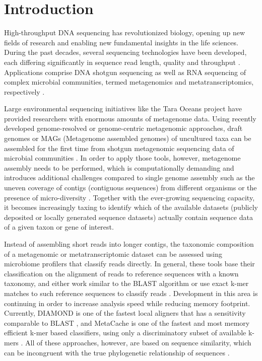 \documentclass{bioinfo}
\begin{document}
\maketitle

\section{Introduction}
High-throughput DNA sequencing has revolutionized biology, opening up new fields of research and enabling new fundamental insights in the life sciences. During the past decades, several sequencing technologies have been developed, each differing significantly in sequence read length, quality and throughput \citep{Mardis2017}. Applications comprise DNA shotgun sequencing as well as RNA sequencing of complex microbial communities, termed metagenomics and metatranscriptomics, respectively \citep{Mitchell2018}. 

Large environmental sequencing initiatives like the Tara Oceans project \citep{Sunagawa2015} have provided researchers with enormous amounts of metagenome data. Using recently developed genome-resolved or genome-centric metagenomic approaches, draft genomes or MAGs (Metagenome assembled genomes) of uncultured taxa can be assembled for the first time from shotgun metagenomic sequencing data of microbial communities \citep{Alneberg2014,Eren2015}. In order to apply those tools, however, metagenome assembly needs to be performed, which is computationally demanding and introduces additional challenges compared to single genome assembly such as the uneven coverage of contigs (contiguous sequences) from different organisms or the presence of micro-diversity \citep{Quince2017}. Together with the ever-growing sequencing capacity, it becomes increasingly taxing to identify which of the available datasets (publicly deposited or locally generated sequence datasets) actually contain sequence data of a given taxon or gene of interest.

Instead of assembling short reads into longer contigs, the taxonomic composition of a metagenomic or metatranscriptomic dataset can be assessed using microbiome profilers that classify reads directly. In general, these tools base their classification on the alignment of reads to reference sequences with a known taxonomy, and either work similar to the BLAST algorithm \citep[e.g. ][]{Huson2016,Truong2015} or use exact k-mer matches to such reference sequences to classify reads \citep[e.g. ][]{Ounit2015,Wood2014}. Development in this area is continuing in order to increase analysis speed while reducing memory footprint. Currently, DIAMOND is one of the fastest local aligners that has a sensitivity comparable to BLAST \citep{Buchfink2014}, and MetaCache is one of the fastest and most memory efficient k-mer based classifiers, using only a discriminatory subset of available k-mers \citep{Muller2017}. All of these approaches, however, are based on sequence similarity, which can be incongruent with the true phylogenetic relationship of sequences \citep{Smith2017}.
\end{document}
